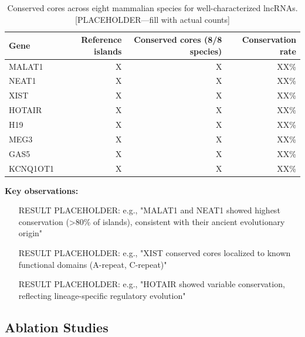 \documentclass[11pt]{article}
\begin{document}
\begin{table}[h]
\centering
\caption{Conserved cores across eight mammalian species for well-characterized lncRNAs. [PLACEHOLDER—fill with actual counts]}
\label{tab:conserved_cores}
\begin{tabular}{lrrr}
\toprule
Gene & Reference islands & Conserved cores (8/8 species) & Conservation rate \\
\midrule
MALAT1    & X & X & XX\% \\
NEAT1     & X & X & XX\% \\
XIST      & X & X & XX\% \\
HOTAIR    & X & X & XX\% \\
H19       & X & X & XX\% \\
MEG3      & X & X & XX\% \\
GAS5      & X & X & XX\% \\
KCNQ1OT1  & X & X & XX\% \\
\bottomrule
\end{tabular}
\end{table}

\textbf{Key observations:}
\begin{itemize}
\item [RESULT PLACEHOLDER: e.g., "MALAT1 and NEAT1 showed highest conservation (>80\% of islands), consistent with their ancient evolutionary origin"]
\item [RESULT PLACEHOLDER: e.g., "XIST conserved cores localized to known functional domains (A-repeat, C-repeat)"]
\item [RESULT PLACEHOLDER: e.g., "HOTAIR showed variable conservation, reflecting lineage-specific regulatory evolution"]
\end{itemize}


\subsection{Ablation Studies}
\end{document}
